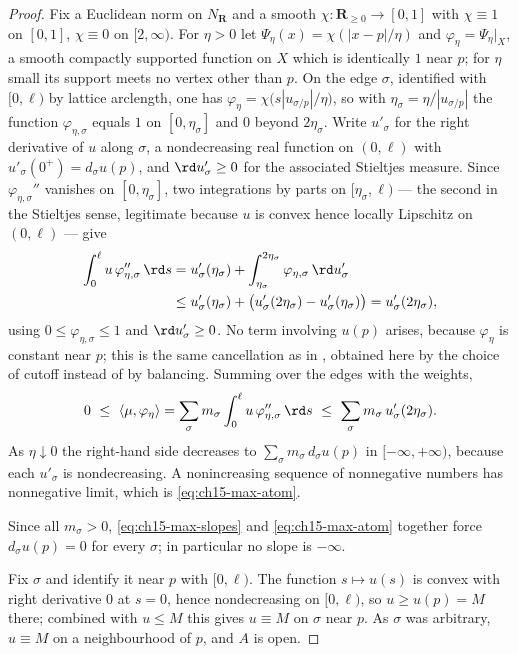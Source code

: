 \begin{proof}
Fix a Euclidean norm on $N_{\mathbf R}$ and a smooth
$\chi:\mathbf R_{\ge0}\to[0,1]$ with $\chi\equiv1$ on $[0,1]$,
$\chi\equiv0$ on $[2,\infty)$.  For $\eta>0$ let $\Psi_\eta(x)=\chi(|x-p|/\eta)$
and $\varphi_\eta=\Psi_\eta|_X$, a smooth compactly supported function on $X$
which is identically $1$ near $p$; for $\eta$ small its support meets no
vertex other than $p$.  On the edge $\sigma$, identified with $[0,\ell)$ by
lattice arclength, one has $\varphi_\eta=\chi\bigl(s|u_{\sigma/p}|/\eta\bigr)$,
so with $\eta_\sigma=\eta/|u_{\sigma/p}|$ the function
$\varphi_{\eta,\sigma}$ equals $1$ on $[0,\eta_\sigma]$ and $0$ beyond
$2\eta_\sigma$.  Write $u'_\sigma$ for the right derivative of $u$ along
$\sigma$, a nondecreasing real function on $(0,\ell)$ with
$u'_\sigma(0^+)=d_\sigma u(p)$, and $\rd u'_\sigma\ge0$ for the associated
Stieltjes measure.  Since $\varphi_{\eta,\sigma}''$ vanishes on
$[0,\eta_\sigma]$, two integrations by parts on $[\eta_\sigma,\ell)$ ---
the second in the Stieltjes sense, legitimate because $u$ is convex hence
locally Lipschitz on $(0,\ell)$ --- give
\[
 \begin{aligned}
 \int_0^{\ell}u\,\varphi_{\eta,\sigma}''\,\rd s
 &=u'_\sigma(\eta_\sigma)
   +\int_{\eta_\sigma}^{2\eta_\sigma}
        \varphi_{\eta,\sigma}\,\rd u'_\sigma
 \\
 &\le u'_\sigma(\eta_\sigma)
   +\bigl(u'_\sigma(2\eta_\sigma)-u'_\sigma(\eta_\sigma)\bigr)
  =u'_\sigma(2\eta_\sigma),
 \end{aligned}
\]
using $0\le\varphi_{\eta,\sigma}\le1$ and $\rd u'_\sigma\ge0$.  No term
involving $u(p)$ arises, because $\varphi_\eta$ is constant near $p$; this
is the same cancellation as in , obtained here by
the choice of cutoff instead of by balancing.  Summing over the edges with
the weights,
\[
 0\ \le\ \langle\mu,\varphi_\eta\rangle
 =\sum_{\sigma}m_\sigma\int_0^\ell u\,\varphi_{\eta,\sigma}''\,\rd s
 \ \le\ \sum_\sigma m_\sigma\,u'_\sigma(2\eta_\sigma).
\]
As $\eta\downarrow0$ the right-hand side decreases to
$\sum_\sigma m_\sigma\,d_\sigma u(p)$ in $[-\infty,+\infty)$, because each
$u'_\sigma$ is nondecreasing.  A nonincreasing sequence of nonnegative
numbers has nonnegative limit, which is \eqref{eq:ch15-max-atom}.

Since all $m_\sigma>0$, \eqref{eq:ch15-max-slopes} and
\eqref{eq:ch15-max-atom} together force $d_\sigma u(p)=0$ for every
$\sigma$; in particular no slope is $-\infty$.

Fix $\sigma$ and identify it near $p$ with $[0,\ell)$.  The function
$s\mapsto u(s)$ is convex with right derivative $0$ at $s=0$, hence
nondecreasing on $[0,\ell)$, so $u\ge u(p)=M$ there; combined with $u\le M$
this gives $u\equiv M$ on $\sigma$ near $p$.  As $\sigma$ was arbitrary,
$u\equiv M$ on a neighbourhood of $p$, and $A$ is open.
\end{proof}

